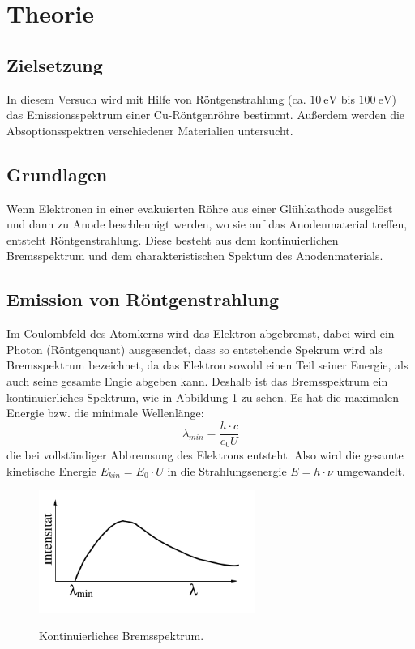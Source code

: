 \section{Theorie}
\label{sec:Theorie}
\subsection{Zielsetzung}
In diesem Versuch wird mit Hilfe von Röntgenstrahlung (ca. $\SI{10}{\eV}$ bis $\SI{100}{\eV}$)
das Emissionsspektrum einer
Cu-Röntgenröhre bestimmt. Außerdem werden die Absoptionsspektren verschiedener
Materialien untersucht.

\subsection{Grundlagen}
Wenn Elektronen in einer evakuierten Röhre aus einer Glühkathode ausgelöst und
dann zu Anode beschleunigt werden, wo sie auf das Anodenmaterial treffen, entsteht
Röntgenstrahlung. Diese besteht aus dem kontinuierlichen Bremsspektrum und dem
charakteristischen Spektum des Anodenmaterials.

\subsection{Emission von Röntgenstrahlung}

Im Coulombfeld des Atomkerns wird das Elektron abgebremst, dabei wird ein
Photon (Röntgenquant) ausgesendet, dass so entstehende Spekrum wird als Bremsspektrum
bezeichnet, da das Elektron sowohl einen Teil seiner Energie, als auch
seine gesamte Engie abgeben kann. Deshalb ist das Bremsspektrum ein kontinuierliches
Spektrum, wie in Abbildung \ref{fig:kont} zu sehen. Es hat die maximalen Energie bzw. die minimale Wellenlänge:
\begin{equation}
  \lambda_{min}=\frac{h\cdot c}{e_0 U}
  \label{lamdbamin}
\end{equation}
die bei vollständiger Abbremsung des Elektrons entsteht. Also wird die gesamte
kinetische Energie $E_{kin}=E_{0} \cdot U$ in die  Strahlungsenergie $E=h\cdot \nu$
umgewandelt.
\begin{figure}
  \centering
  \includegraphics[height=4cm]{kont.png}
  \caption{Kontinuierliches Bremsspektrum.}
  \label{fig:kont}
  \cite{skript}
\end{figure}

